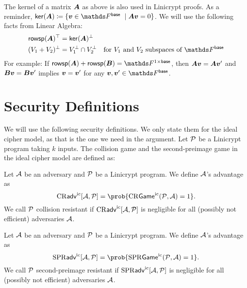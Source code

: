The kernel of a matrix $\v A$ as above is also used in Linicrypt proofs.
As a reminder, $\ker(\v A) \coloneqq \{ \vv \in \Fsp\ \mid \v A \vv = 0\}$.
We will use the following facts from Linear Algebra:
\begin{align*}
  \rowsp(\v A)^\top &= \ker(\v A)^\perp \\
  (V_1 + V_2)^\perp &= V_1^\perp \cap V_2^\perp \quad \textrm{for $V_1$ and $V_2$ subspaces of $\Fsp$}
\end{align*}
For example:
If $\rowsp(\v A) + \rowsp(\v B) = \Frowsp$,
then $\v A \vv = \v A \vv'$ and $\v B \vv = \v B \vv'$ implies $\vv = \vv'$ for any $\vv, \vv' \in \Fsp$.

\section{Security Definitions}
We will use the following security definitions.
We only state them for the ideal cipher model,
as that is the one we need in the argument.
Let $\P$ be a Linicrypt program taking $k$ inputs.
The collision game and the second-preimage game in the ideal cipher model are defined as:
\begin{pchstack}[center, space=0.4cm]
\end{pchstack}

\begin{defn}
  Let $\A$ be an adversary and $\P$ be a Linicrypt program.
  We define $\A$'s advantage as 
  \[
    \cradv[\A, \P] = \prob{\crgame(\P, \A) = 1}.
  \]
  We call $\P$ collision resistant if
  $\cradv[\A, \P]$ is negligible for all (possibly not efficient) adversaries $\A$.
\end{defn}

\begin{defn}
  Let $\A$ be an adversary and $\P$ be a Linicrypt program.
  We define $\A$'s advantage as 
  \[
    \spradv[\A, \P] = \prob{\sprgame(\P, \A) = 1}.
  \]
  We call $\P$ second-preimage resistant
  if $\spradv[\A, \P]$ is negligible for all (possibly not efficient) adversaries $\A$.
\end{defn}

